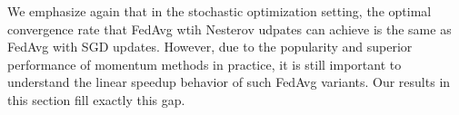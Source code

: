 We emphasize again that in the stochastic optimization setting, the optimal convergence rate that FedAvg wtih Nesterov udpates can achieve is the same as FedAvg with SGD updates. However, due to the popularity and superior performance of momentum methods in practice, it is still important to understand the linear speedup behavior of such FedAvg variants. Our results in this section fill exactly this gap. 

	\begin{comment}
	It is possible to extend the results in this section to accelerated
    FedAvg algorithms with other momentum-based updates. However, as know from stochastic optimization, Nesterov and other momentum
updates may fail to accelerate over SGD (\cite{liu2018accelerating,kidambi2018insufficiency,liu2018toward,yuan2016influence}).
    For this reason, we instead turn to the overparameterized setting
    \cite{ma2017power,liu2018accelerating,canziani2016analysis} in Section~\ref{sec:app:overparameterized} of the appendix where we show that FedAvg enjoys geometric convergence
    and it is possible to improve its convergence rate with a new momentum-based FedAvg variant, which we term ``FedMaSS''.
	\end{comment}